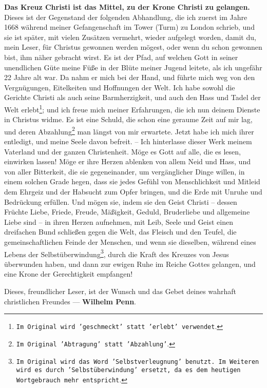 \textbf{Das Kreuz Christi ist das Mittel, zu der Krone Christi zu gelangen.}
Dieses ist der Gegenstand der folgenden Abhandlung, die ich zuerst im Jahre 1668
während meiner Gefangenschaft  im Tower (Turm) zu London
 schrieb, und sie ist später, mit vielen Zusätzen vermehrt, wieder
aufgelegt worden, damit du, mein Leser, für Christus gewonnen werden mögest,
oder wenn du schon gewonnen bist, ihm näher gebracht wirst. Es ist der Pfad, auf
welchen Gott in seiner unendlichen Güte meine Füße in der Blüte meiner Jugend
leitete, als ich ungefähr 22 Jahre alt war. Da nahm er mich bei der Hand, und
führte mich weg von den Vergnügungen, Eitelkeiten und Hoffnungen der Welt. Ich
habe sowohl die Gerichte Christi als auch seine Barmherzigkeit, und auch den
Hass und Tadel der Welt erlebt\footnote{\texttt{Im Original wird 'geschmeckt'
statt 'erlebt' verwendet}.}; und ich freue mich meiner Erfahrungen, die ich nun
deinem
Dienste in Christus widme. Es ist eine Schuld, die schon eine geraume Zeit auf
mir lag, und deren Abzahlung\footnote{\texttt{Im Original 'Abtragung' statt
'Abzahlung'}.} man längst von mir erwartete. Jetzt habe ich mich ihrer
entledigt, und meine Seele davon befreit. -- Ich hinterlasse dieser Werk meinem
Vaterland und der ganzen Christenheit. Möge es Gott auf alle, die es lesen,
einwirken lassen! Möge er ihre Herzen ablenken von allem Neid und Hass, und von
aller Bitterkeit, die sie gegeneinander, um vergänglicher Dinge willen, in
einem solchen Grade hegen, dass sie jedes Gefühl von Menschlichkeit und Mitleid
dem Ehrgeiz und der Habsucht zum Opfer bringen, und die Erde mit Unruhe und
Bedrückung erfüllen. Und mögen sie, indem sie den Geist Christi -- dessen
Früchte Liebe, Friede, Freude, Mäßigkeit, Geduld, Bruderliebe und allgemeine
Liebe sind -- in ihren Herzen aufnehmen, mit Leib, Seele und Geist einen
dreifachen Bund schließen gegen die Welt, das Fleisch und den Teufel, die
gemeinschaftlichen Feinde der Menschen, und wenn sie dieselben, während eines
Lebens der Selbstüberwindung\footnote{\texttt{Im Original wird das Word
'Selbstverleugnung' benutzt. Im Weiteren wird es durch 'Selbstüberwindung'
ersetzt, da es dem heutigen Wortgebrauch mehr entspricht}.}, durch die Kraft des
Kreuzes von Jesus überwunden haben, und dann zur ewigen Ruhe im Reiche Gottes
gelangen, und eine Krone der Gerechtigkeit empfangen!


\medskip

Dieses, freundlicher Leser, ist der Wunsch und das Gebet deines wahrhaft
christlichen Freundes --- \textbf{Wilhelm Penn}.


